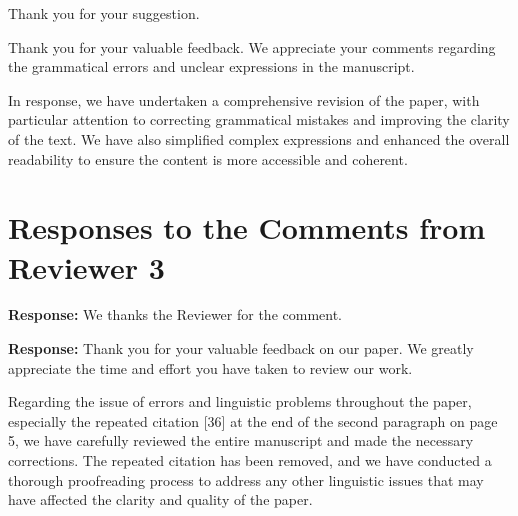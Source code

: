 \documentclass[a4paper,twoside,11pt,dvipsnames]{reviewresponse}
\begin{document}
Thank you for your suggestion.


Thank you for your valuable feedback. We appreciate your comments regarding the grammatical errors and unclear expressions in the manuscript.

In response, we have undertaken a comprehensive revision of the paper, with particular attention to correcting grammatical mistakes and improving the clarity of the text. We have also simplified complex expressions and enhanced the overall readability to ensure the content is more accessible and coherent.

\newpage

\section{Responses to the Comments from Reviewer 3}
\textbf{Response:} 
We thanks the Reviewer for the comment.




\textbf{Response:} Thank you for your valuable feedback on our paper. We greatly appreciate the time and effort you have taken to review our work.

Regarding the issue of errors and linguistic problems throughout the paper, especially the repeated citation [36] at the end of the second paragraph on page 5, we have carefully reviewed the entire manuscript and made the necessary corrections. The repeated citation has been removed, and we have conducted a thorough proofreading process to address any other linguistic issues that may have affected the clarity and quality of the paper.
\end{document}
